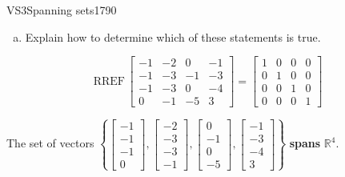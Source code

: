 \begin{exercise}{VS3}{Spanning sets}{1790}
\begin{exerciseStatement}
\begin{enumerate}[(a)]
\begin{itemize}
 
\end{itemize}

     
\item  

 Explain how to determine which of these statements is true. 

 
\end{enumerate}

     \end{exerciseStatement}
 \begin{exerciseAnswer} 

 \[
\mathrm{RREF}\, \left[\begin{array}{cccc}
-1 & -2 & 0 & -1 \\
-1 & -3 & -1 & -3 \\
-1 & -3 & 0 & -4 \\
0 & -1 & -5 & 3
\end{array}\right] = \left[\begin{array}{cccc}
1 & 0 & 0 & 0 \\
0 & 1 & 0 & 0 \\
0 & 0 & 1 & 0 \\
0 & 0 & 0 & 1
\end{array}\right]
            \] 

 

 The set of vectors \(\left\{ \left[\begin{array}{c}
-1 \\
-1 \\
-1 \\
0
\end{array}\right] , \left[\begin{array}{c}
-2 \\
-3 \\
-3 \\
-1
\end{array}\right] , \left[\begin{array}{c}
0 \\
-1 \\
0 \\
-5
\end{array}\right] , \left[\begin{array}{c}
-1 \\
-3 \\
-4 \\
3
\end{array}\right] \right\}\) \textbf{spans} \(\mathbb{R}^4\). 

 \end{exerciseAnswer}
 \end{exercise}


